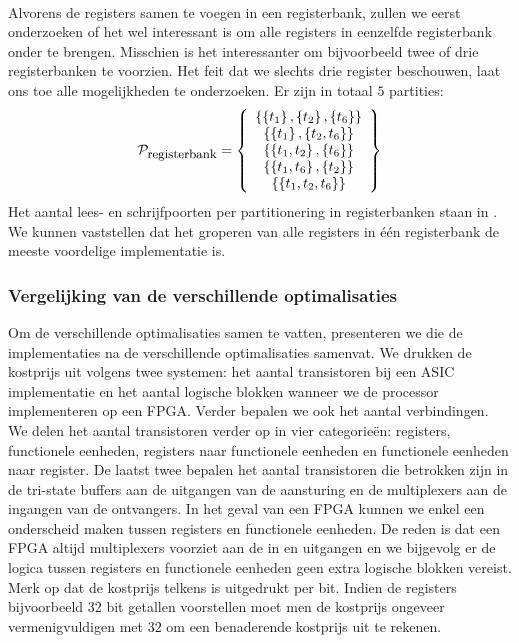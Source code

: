 \paragraph{}
Alvorens de registers samen te voegen in een registerbank, zullen we eerst onderzoeken of het wel interessant is om alle registers in eenzelfde registerbank onder te brengen. Misschien is het interessanter om bijvoorbeeld twee of drie registerbanken te voorzien. Het feit dat we slechts drie register beschouwen, laat ons toe alle mogelijkheden te onderzoeken. Er zijn in totaal $5$ partities:
\begin{equation}
\mathcal{P}_{\mbox{\small registerbank}}=\left\{ \begin{array}{c} 
\left\{ \left\{ t_1 \right\},\left\{ t_2 \right\},\left\{ t_6 \right\} \right\}\\
\left\{ \left\{ t_1 \right\},\left\{ t_2,t_6 \right\} \right\}\\
\left\{ \left\{ t_1,t_2 \right\},\left\{ t_6 \right\} \right\}\\
\left\{ \left\{ t_1,t_6 \right\},\left\{ t_2 \right\} \right\}\\
\left\{ \left\{ t_1,t_2,t_6 \right\} \right\}
 \end{array} \right\}
\end{equation}
Het aantal lees- en schrijfpoorten per partitionering in registerbanken staan in . We kunnen vaststellen dat het groperen van alle registers in \'e\'en registerbank de meeste voordelige implementatie is.
\subsubsection{Vergelijking van de verschillende optimalisaties}
Om de verschillende optimalisaties samen te vatten, presenteren we  die de implementaties na de verschillende optimalisaties samenvat. We drukken de kostprijs uit volgens twee systemen: het aantal transistoren bij een ASIC implementatie en het aantal logische blokken wanneer we de processor implementeren op een FPGA. Verder bepalen we ook het aantal verbindingen. We delen het aantal transistoren verder op in vier categorie\"en: registers, functionele eenheden, registers naar functionele eenheden en functionele eenheden naar register. De laatst twee bepalen het aantal transistoren die betrokken zijn in de tri-state buffers aan de uitgangen van de aansturing en de multiplexers aan de ingangen van de ontvangers. In het geval van een FPGA kunnen we enkel een onderscheid maken tussen registers en functionele eenheden. De reden is dat een FPGA altijd multiplexers voorziet aan de in en uitgangen en we bijgevolg er de logica tussen registers en functionele eenheden geen extra logische blokken vereist. Merk op dat de kostprijs telkens is uitgedrukt per bit. Indien de registers bijvoorbeeld 32 bit getallen voorstellen moet men de kostprijs ongeveer vermenigvuldigen met $32$ om een benaderende kostprijs uit te rekenen.
